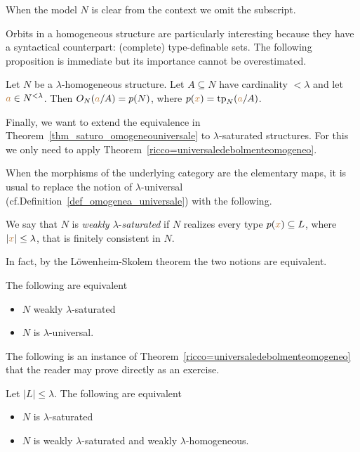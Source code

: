 
When the model $N$ is clear from the context we omit the subscript.

Orbits in a homogeneous structure are particularly interesting because they have a syntactical counterpart: (complete) type-definable sets.
The following proposition is immediate but its importance cannot be overestimated.

\begin{proposition}\label{omogeneitaorbitetipi}
Let $N$ be a $\lambda\mbox{-}$homogeneous structure. Let $A\subseteq N$ have cardinality $<\lambda$ and let ${\color{brown} a}\in N^{<\lambda}$. Then $O_N({\color{brown} a}/A)=p(N)$, where $p({\color{brown} x})={\rm tp}_N({\color{brown} a}/A)$.
\end{proposition}


Finally, we want to extend the equivalence in Theorem~\ref{thm_saturo_omogeneouniversale} to $\lambda\mbox{-}$saturated structures. For this we only need to apply Theorem~\ref{ricco=universaledebolmenteomogeneo}. 

When the morphisms of the underlying category are the elementary maps, it is usual to replace the notion of $\lambda\mbox{-}$universal (cf.\@ Definition~\ref{def_omogenea_universale}) with the following.

\begin{definition}\label{def_w_saturation}
  We say that $N$ is \emph{weakly $\lambda\mbox{-}$saturated\/} if $N$ realizes every type $p({\color{brown} x})\subseteq L$, where $|{\color{brown} x}|\le\lambda$, that is finitely consistent in $N$.
\end{definition}

In fact, by the L\"owenheim-Skolem theorem the two notions are equivalent.

\begin{proposition}\label{prop_w_saturation}
The following are equivalent
\begin{itemize}
\item[1.] $N$ weakly $\lambda\mbox{-}$saturated
\item[2.] $N$ is $\lambda$-universal.
\end{itemize}
\end{proposition}

The following is an instance of Theorem~\ref{ricco=universaledebolmenteomogeneo} that the reader may prove directly as an exercise.

\begin{corollary}\label{saturo=universaledebolmenteomogeneo}
Let $|L|\le\lambda$. The following are equivalent\nobreak
\begin{itemize}
\item[1.] $N$ is $\lambda\mbox{-}$saturated
\item[2.] $N$ is weakly $\lambda\mbox{-}$saturated and weakly $\lambda\mbox{-}$homogeneous.
\end{itemize}
\end{corollary}

